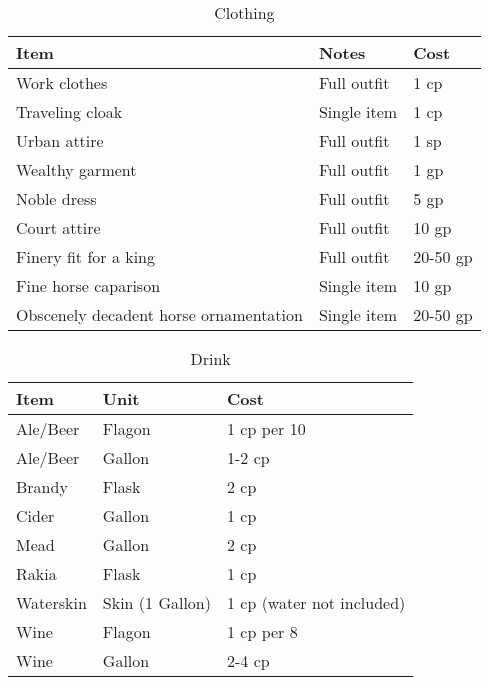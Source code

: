 \documentclass[oneside,11pt,english]{book}
\begin{document}
\begin{table}[hb]
	\centering
	\caption{Clothing}
	\label{tab:Clothing}
	\begin{tabu} spread 0pt {*{3}{X[-1]}}
		Item &Notes &Cost\\\toprule
Work clothes &Full outfit &1 cp\\
Traveling cloak &Single item &1 cp\\
Urban attire &Full outfit &1 sp\\
Wealthy garment &Full outfit &1 gp\\
Noble dress &Full outfit &5 gp\\
Court attire &Full outfit &10 gp\\
Finery fit for a king &Full outfit &20-50 gp\\
Fine horse caparison &Single item &10 gp\\
Obscenely decadent horse ornamentation &Single item &20-50 gp\\
	\end{tabu}
\end{table}

\begin{table}[hb]
	\centering
	\caption{Drink}
	\label{tab:Drink}
	\begin{tabu} spread 0pt {*{3}{X[-1]}}
		Item &Unit &Cost\\\toprule
Ale/Beer &Flagon &1 cp per 10\\
Ale/Beer &Gallon &1-2 cp\\
Brandy &Flask &2 cp\\
Cider &Gallon &1 cp\\
Mead &Gallon &2 cp\\
Rakia &Flask &1 cp\\
Waterskin &Skin (1 Gallon) &1 cp (water not included)\\
Wine &Flagon &1 cp per 8\\
Wine &Gallon &2-4 cp\\
	\end{tabu}
\end{table}
\end{document}
